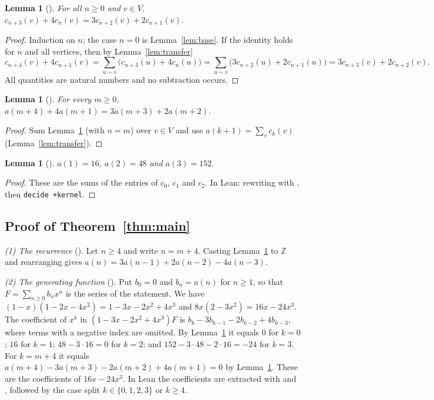 \documentclass[11pt]{amsart}
\theoremstyle{plain}
\newtheorem{lemma}[theorem]{Lemma}
\theoremstyle{definition}
\newcommand{\Z}{\mathbb{Z}}
\begin{document}
\begin{lemma}[]\label{lem:propagate}
For all $n\ge0$ and $v\in V$, $c_{n+3}(v)+4c_n(v)=3c_{n+2}(v)+2c_{n+1}(v)$.
\end{lemma}

\begin{proof}
Induction on $n$; the case $n=0$ is Lemma~\ref{lem:base}. If the identity holds for $n$ and all vertices, then by Lemma~\ref{lem:transfer}
\[
  c_{n+4}(v)+4c_{n+1}(v)=\sum_{u\sim v}\bigl(c_{n+3}(u)+4c_n(u)\bigr)
  =\sum_{u\sim v}\bigl(3c_{n+2}(u)+2c_{n+1}(u)\bigr)=3c_{n+3}(v)+2c_{n+2}(v).
\]
All quantities are natural numbers and no subtraction occurs.
\end{proof}

\begin{lemma}[]\label{lem:arec}
For every $m\ge0$, $a(m+4)+4a(m+1)=3a(m+3)+2a(m+2)$.
\end{lemma}

\begin{proof}
Sum Lemma~\ref{lem:propagate} (with $n=m$) over $v\in V$ and use $a(k+1)=\sum_vc_k(v)$ (Lemma~\ref{lem:transfer}).
\end{proof}

\begin{lemma}[]\label{lem:small}
$a(1)=16$, $a(2)=48$ and $a(3)=152$.
\end{lemma}

\begin{proof}
These are the sums of the entries of $c_0$, $c_1$ and $c_2$. In Lean: rewriting with , then \texttt{decide +kernel}.
\end{proof}

\subsection{Proof of Theorem~\ref{thm:main}}

\emph{(1) The recurrence} (). Let $n\ge4$ and write $n=m+4$. Casting Lemma~\ref{lem:arec} to $\Z$ and rearranging gives $a(n)=3a(n-1)+2a(n-2)-4a(n-3)$.

\emph{(2) The generating function} (). Put $b_0=0$ and $b_n=a(n)$ for $n\ge1$, so that $F=\sum_{n\ge0}b_nx^n$ is the series of the statement. We have $(1-x)(1-2x-4x^2)=1-3x-2x^2+4x^3$ and $8x(2-3x^2)=16x-24x^3$. The coefficient of $x^k$ in $(1-3x-2x^2+4x^3)F$ is $b_k-3b_{k-1}-2b_{k-2}+4b_{k-3}$, where terms with a negative index are omitted. By Lemma~\ref{lem:small} it equals $0$ for $k=0$; $16$ for $k=1$; $48-3\cdot16=0$ for $k=2$; and $152-3\cdot48-2\cdot16=-24$ for $k=3$. For $k=m+4$ it equals $a(m+4)-3a(m+3)-2a(m+2)+4a(m+1)=0$ by Lemma~\ref{lem:arec}. These are the coefficients of $16x-24x^3$. In Lean the coefficients are extracted with  and , followed by the case split $k\in\{0,1,2,3\}$ or $k\ge4$.
\end{document}
